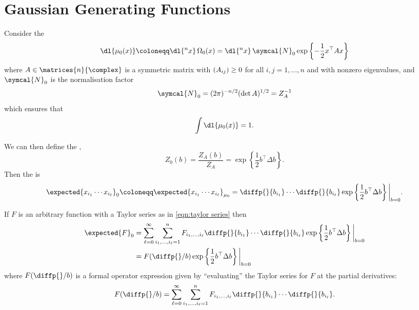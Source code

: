 \documentclass[fleqn]{NotesClass}
\let\Re\relax
\DeclareMathOperator{\Re}{Re}
\newcommand{\trans}{{\top}}
\begin{document}
    \section{Gaussian Generating Functions}
    Consider the 
    \begin{equation}
        \dl{\mu_0(x)} \coloneqq \dl{^nx} \, \Omega_0(x) = \dl{^n x} \, \symcal{N}_0 \exp\left\{ -\frac{1}{2} x^\trans A x \right\}
    \end{equation}
    where \(A \in \matrices{n}{\complex}\) is a symmetric matrix with \(\Re(A_{ij}) \ge 0\) for all \(i, j = 1, \dotsc, n\) and with nonzero eigenvalues, and \(\symcal{N}_0\) is the normalisation factor
    \begin{equation}
        \symcal{N}_0 = (2\pi)^{-n/2} (\det A)^{1/2} = Z_A^{-1}
    \end{equation}
    which ensures that
    \begin{equation}
        \int \dl{\mu_0(x)} = 1.
    \end{equation}
    
    We can then define the ,
    \begin{equation}
        Z_0(b) = \frac{Z_A(b)}{Z_A} = \exp\left\{ \frac{1}{2} b^\trans \Delta b \right\}.
    \end{equation}
    Then the  is
    \begin{equation}
        \expected{x_{i_1} \dotsm x_{i_\ell}}_0 \coloneqq \expected{x_{i_1} \dotsm x_{i_\ell}}_{\mu_0} = \diffp{}{b_{i_1}} \dotsm \diffp{}{b_{i_\ell}} \exp\left\{ \frac{1}{2}b^\trans \Delta b \right\}\bigg|_{b = 0}.
    \end{equation}
    
    If \(F\) is an arbitrary function with a Taylor series as in \cref{eqn:taylor series} then
    \begin{align}
        \expected{F}_0 &= \sum_{\ell = 0}^{\infty} \sum_{i_1, \dotsc, i_\ell = 1}^{n} F_{i_1, \dotsc, i_{\ell}} \diffp{}{b_{i_1}} \dotsm \diffp{}{b_{i_{\ell}}} \exp\left\{ \frac{1}{2} b^\trans \Delta b \right\} \bigg|_{b = 0}\\
        &= F(\diffp{}/{b}) \exp\left\{ \frac{1}{2} b^\trans \Delta b \right\}\bigg|_{b = 0}
    \end{align}
    where \(F(\diffp{}/{b})\) is a formal operator expression given by \enquote{evaluating} the Taylor series for \(F\) at the partial derivatives:
    \begin{equation}
        F(\diffp{}/{b}) = \sum_{\ell = 0}^{\infty} \sum_{i_1, \dotsc, i_{\ell} = 1}^{n} F_{i_1, \dotsc, i_{\ell}} \diffp{}{b_{i_1}} \dotsm \diffp{}{b_{i_\ell}}.
    \end{equation}
    
\end{document}
